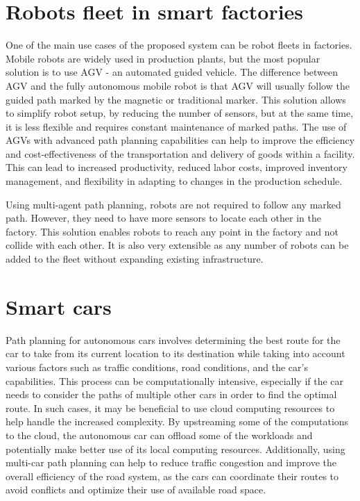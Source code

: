 \section{Robots fleet in smart factories}
One of the main use cases of the proposed system can be robot fleets in factories. Mobile robots are widely used in production plants, but the most popular solution is to use AGV - an automated guided vehicle\cite{agv}. The difference between AGV and the fully autonomous mobile robot is that AGV will usually follow the guided path marked by the magnetic or traditional marker. This solution allows to simplify robot setup, by reducing the number of sensors, but at the same time, it is less flexible and requires constant maintenance of marked paths. The use of AGVs with advanced path planning capabilities can help to improve the efficiency and cost-effectiveness of the transportation and delivery of goods within a facility. This can lead to increased productivity, reduced labor costs, improved inventory management, and flexibility in adapting to changes in the production schedule\cite{a_star_factories}.

Using multi-agent path planning, robots are not required to follow any marked path. However, they need to have more sensors to locate each other in the factory. This solution enables robots to reach any point in the factory and not collide with each other. It is also very extensible as any number of robots can be added to the fleet without expanding existing infrastructure.

\section{Smart cars}

Path planning for autonomous cars involves determining the best route for the car to take from its current location to its destination while taking into account various factors such as traffic conditions, road conditions, and the car's capabilities. This process can be computationally intensive, especially if the car needs to consider the paths of multiple other cars in order to find the optimal route. In such cases, it may be beneficial to use cloud computing resources to help handle the increased complexity. By upstreaming some of the computations to the cloud, the autonomous car can offload some of the workloads and potentially make better use of its local computing resources. Additionally, using multi-car path planning can help to reduce traffic congestion and improve the overall efficiency of the road system, as the cars can coordinate their routes to avoid conflicts and optimize their use of available road space\cite{smart_cars}.